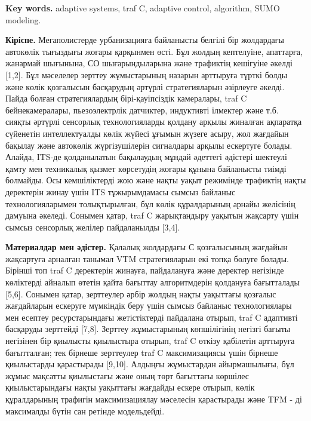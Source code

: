 {\bfseries Key words.} adaptive systems, traf C, adaptive control,
algorithm, SUMO modeling.

{\bfseries Кіріспе.} Мегаполистерде урбанизацияға байланысты белгілі бір
жолдардағы автокөлік тығыздығы жоғары қарқынмен өсті. Бұл жолдың
кептелуіне, апаттарға, жанармай шығынына, СО шығарындыларына және
трафиктің кешігуіне әкелді {[}1,2{]}. Бұл мәселелер зерттеу жұмыстарының
назарын арттыруға түрткі болды және көлік қозғалысын басқарудың әртүрлі
стратегияларын әзірлеуге әкелді. Пайда болған стратегиялардың
бірі-қауіпсіздік камералары, traf C бейнекамералары, пьезоэлектрлік
датчиктер, индуктивті ілмектер және т.б. сияқты әртүрлі сенсорлық
технологияларды қолдану арқылы жиналған ақпаратқа сүйенетін
интеллектуалды көлік жүйесі ұғымын жүзеге асыру, жол жағдайын бақылау
және автокөлік жүргізушілерін сигналдары арқылы ескертуге болады.
Алайда, ITS-де қолданылатын бақылаудың мұндай әдеттегі әдістері шектеулі
қамту мен техникалық қызмет көрсетудің жоғары құнына байланысты тиімді
болмайды. Осы кемшіліктерді жою және нақты уақыт режимінде трафиктің
нақты деректерін жинау үшін ITS тұжырымдамасы сымсыз байланыс
технологияларымен толықтырылған, бұл көлік құралдарының арнайы желісінің
дамуына әкеледі. Сонымен қатар, traf C жарықтандыру уақытын жақсарту
үшін сымсыз сенсорлық желілер пайдаланылды {[}3,4{]}.

{\bfseries Материалдар мен әдістер.} Қалалық жолдардағы С қозғалысының
жағдайын жақсартуға арналған танымал VTM стратегияларын екі топқа бөлуге
болады. Бірінші топ traf C деректерін жинауға, пайдалануға және деректер
негізінде көліктерді айналып өтетін қайта бағыттау алгоритмдерін
қолдануға бағытталады {[}5,6{]}. Сонымен қатар, зерттеулер әрбір жолдың
нақты уақыттағы қозғалыс жағдайларын ескеруге мүмкіндік беру үшін сымсыз
байланыс технологиялары мен есептеу ресурстарындағы жетістіктерді
пайдалана отырып, traf C адаптивті басқаруды зерттейді {[}7,8{]}.
Зерттеу жұмыстарының көпшілігінің негізгі бағыты негізінен бір қиылысты
қиылыстыра отырып, traf C өткізу қабілетін арттыруға бағытталған; тек
бірнеше зерттеулер traf C максимизациясы үшін бірнеше қиылыстарды
қарастырады {[}9,10{]}. Алдыңғы жұмыстардан айырмашылығы, бұл жұмыс
мақсатты қиылыстағы және оның төрт бағыттағы көршілес қиылыстарындағы
нақты уақыттағы жағдайды ескере отырып, көлік құралдарының трафигін
максимизациялау мәселесін қарастырады және TFM - ді максималды бүтін сан
ретінде модельдейді.

